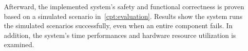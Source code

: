 Afterward, the implemented system's safety and functional correctness is proven based on a simulated  scenario in~\autoref{cpt:evaluation}.
Results show the system runs the simulated scenarios successfully, even when an entire component fails.
In addition, the system's time performances and hardware resource utilization is examined.



